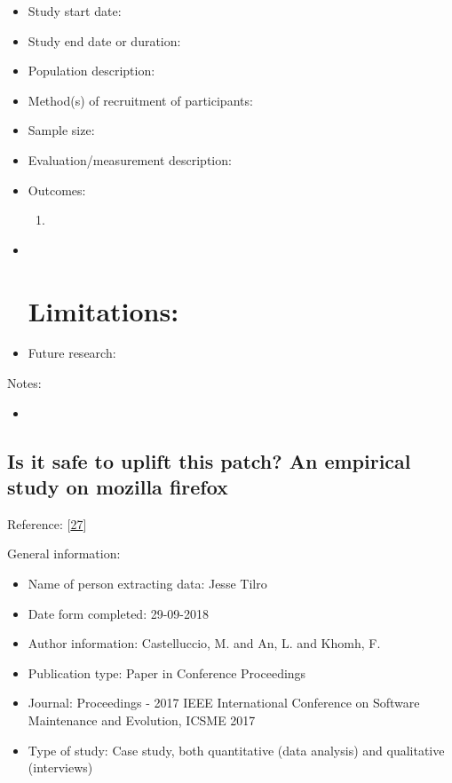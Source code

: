 \documentclass[]{book}
\providecommand{\tightlist}{%
  \setlength{\itemsep}{0pt}\setlength{\parskip}{0pt}}
\begin{document}
\begin{itemize}
\item
  Study start date:
\item
  Study end date or duration:
\item
  Population description:
\item
  Method(s) of recruitment of participants:
\item
  Sample size:
\item
  Evaluation/measurement description:
\item
  Outcomes:

  \begin{enumerate}
  \def\labelenumi{\arabic{enumi}.}
  \item
  \end{enumerate}
\item ~
  \section{Limitations:}\label{limitations}
\item
  Future research:
\end{itemize}

Notes:

\begin{itemize}
\item
\end{itemize}

\subsection{Is it safe to uplift this patch? An empirical study on
mozilla
firefox}\label{is-it-safe-to-uplift-this-patch-an-empirical-study-on-mozilla-firefox}

Reference: {[}\protect\hyperlink{ref-castelluccio2017a}{27}{]}

General information:

\begin{itemize}
\tightlist
\item
  Name of person extracting data: Jesse Tilro
\item
  Date form completed: 29-09-2018
\item
  Author information: Castelluccio, M. and An, L. and Khomh, F.
\item
  Publication type: Paper in Conference Proceedings
\item
  Journal: Proceedings - 2017 IEEE International Conference on Software
  Maintenance and Evolution, ICSME 2017
\item
  Type of study: Case study, both quantitative (data analysis) and
  qualitative (interviews)
\end{itemize}
\end{document}
